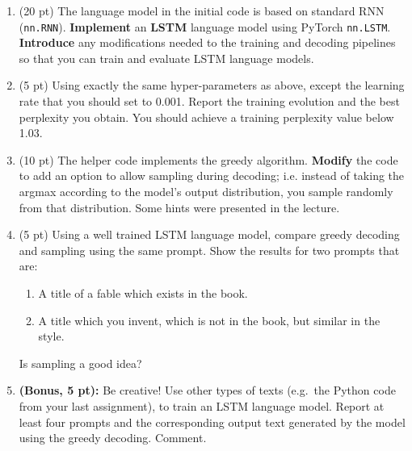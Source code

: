 \documentclass[a4paper,11pt]{article}
\begin{document}
\begin{enumerate}
\item (20 pt) The language model in the initial code is based on standard RNN (\texttt{nn.RNN}). \textbf{Implement} an \textbf{LSTM} language model using PyTorch \texttt{nn.LSTM}.
\textbf{Introduce} any modifications needed to the training and decoding pipelines so that you can train and evaluate LSTM language models.

\item (5 pt) Using exactly the same hyper-parameters as above, except the learning rate that you should set to 0.001. Report the training evolution and the best perplexity you obtain.
You should achieve a training perplexity value below 1.03.

\item (10 pt) The helper code implements the greedy algorithm. \textbf{Modify} the code to add an option to allow sampling during decoding; i.e. instead of taking
the argmax according to the model's output distribution, you sample randomly from that distribution. Some hints were presented in the lecture.

\item (5 pt) Using a well trained LSTM language model, compare greedy decoding and sampling using the same prompt. Show the results for two prompts that are:
\begin{enumerate}
\item A title of a fable which exists in the book.
\item A title which you invent, which is not in the book, but similar in the style.
\end{enumerate}
Is sampling a good idea?



\item {\bf (Bonus, 5 pt):} Be creative! Use other types of texts (e.g.~the Python code from your last assignment),
to train an LSTM language model. Report at least four prompts and the corresponding output text generated by the model using the greedy decoding. Comment.




\end{enumerate}
\end{document}
